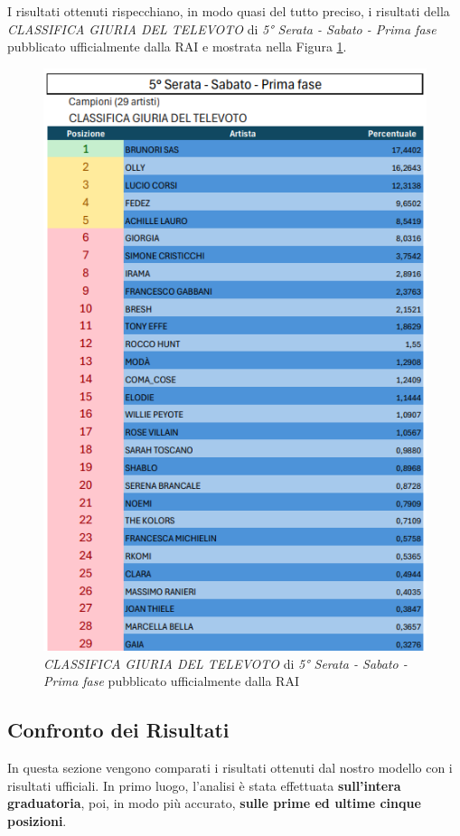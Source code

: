 \documentclass[a4paper,12pt]{article}
\begin{document}
I risultati ottenuti rispecchiano, in modo quasi del tutto preciso, i risultati della \textit{CLASSIFICA GIURIA DEL TELEVOTO} di \textit{5° Serata - Sabato - Prima fase} pubblicato ufficialmente dalla RAI \cite{rai_classifiche_serate} e mostrata nella Figura \ref{fig:classifica_finale_rai}.

\begin{figure}[H]
    \centering
    \includegraphics[width=0.7\linewidth]{media/classifica_finale_rai.png}
    \caption{\textit{CLASSIFICA GIURIA DEL TELEVOTO} di \textit{5° Serata - Sabato - Prima fase} pubblicato ufficialmente dalla RAI \cite{rai_classifiche_serate}}
    \label{fig:classifica_finale_rai}
\end{figure}

\subsection{Confronto dei Risultati}
In questa sezione vengono comparati i risultati ottenuti dal nostro modello con i risultati ufficiali. In primo luogo, l'analisi è stata effettuata \textbf{sull'intera graduatoria}, poi, in modo più accurato, \textbf{sulle prime ed ultime cinque posizioni}.
\end{document}
